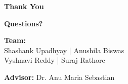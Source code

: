 \documentclass[10pt]{beamer}
\begin{document}
\begin{frame}
\vfill
\begin{center}
{\Huge \textbf{Thank You}}

\vspace{0.5cm}

{\large \textbf{Questions?}}

\vspace{1cm}

\textbf{Team:}\\
Shashank Upadhyay | Anushila Biswas\\
Vyshnavi Reddy | Suraj Rathore

\vspace{0.3cm}

\textbf{Advisor:} Dr. Anu Maria Sebastian
\end{center}
\vfill
\end{frame}
\end{document}
